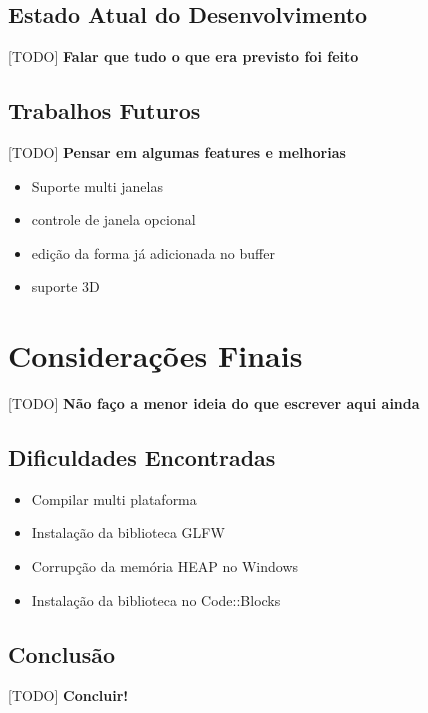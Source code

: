 \documentclass[12pt, %
openright,
oneside, %
a4paper,    %
brazil]{facom-ufu-abntex2}
\begin{document}
\section{Estado Atual do Desenvolvimento}
[TODO] \textbf{Falar que tudo o que era previsto foi feito}

\section{Trabalhos Futuros}
[TODO] \textbf{Pensar em algumas features e melhorias}

\begin{itemize}
    \item Suporte multi janelas
    \item controle de janela opcional
    \item edição da forma já adicionada no buffer
    \item suporte 3D
\end{itemize}

\chapter{Considerações Finais}
[TODO] \textbf{Não faço a menor ideia do que escrever aqui ainda}

\section{Dificuldades Encontradas}

\begin{itemize}
  
  \item Compilar multi plataforma
  \item Instalação da biblioteca GLFW
  \item Corrupção da memória HEAP no Windows
  \item Instalação da biblioteca no Code::Blocks
  
\end{itemize}

\section{Conclusão}
[TODO] \textbf{Concluir!}

\end{document}
